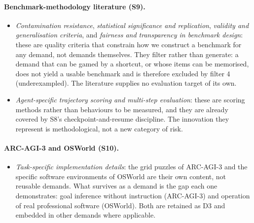 \paragraph{Benchmark-methodology literature (S9).}
\begin{itemize}
\item \emph{Contamination resistance}, \emph{statistical significance and replication}, \emph{validity and generalisation criteria}, and \emph{fairness and transparency in benchmark design}: these are quality criteria that constrain how we construct a benchmark for any demand, not demands themselves. They filter rather than generate: a demand that can be gamed by a shortcut, or whose items can be memorised, does not yield a usable benchmark and is therefore excluded by filter 4 (underexampled). The literature supplies no evaluation target of its own.
\item \emph{Agent-specific trajectory scoring and multi-step evaluation}: these are scoring methods rather than behaviours to be measured, and they are already covered by S8's checkpoint-and-resume discipline. The innovation they represent is methodological, not a new category of risk.
\end{itemize}

\paragraph{ARC-AGI-3 and OSWorld (S10).}
\begin{itemize}
\item \emph{Task-specific implementation details}: the grid puzzles of ARC-AGI-3 and the specific software environments of OSWorld are their own content, not reusable demands. What survives as a demand is the gap each one demonstrates: goal inference without instruction (ARC-AGI-3) and operation of real professional software (OSWorld). Both are retained as D3 and embedded in other demands where applicable.
\end{itemize}
